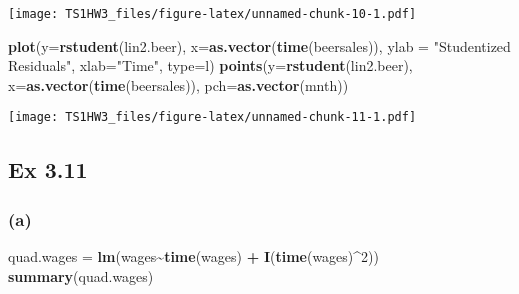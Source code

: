\documentclass[
]{article}
\newenvironment{Shaded}{\begin{snugshade}}{\end{snugshade}}
\newcommand{\AttributeTok}[1]{\textcolor[rgb]{0.13,0.29,0.53}{#1}}
\newcommand{\DecValTok}[1]{\textcolor[rgb]{0.00,0.00,0.81}{#1}}
\newcommand{\FunctionTok}[1]{\textcolor[rgb]{0.13,0.29,0.53}{\textbf{#1}}}
\newcommand{\NormalTok}[1]{#1}
\newcommand{\OtherTok}[1]{\textcolor[rgb]{0.56,0.35,0.01}{#1}}
\newcommand{\SpecialCharTok}[1]{\textcolor[rgb]{0.81,0.36,0.00}{\textbf{#1}}}
\newcommand{\StringTok}[1]{\textcolor[rgb]{0.31,0.60,0.02}{#1}}
\begin{document}
\begin{Shaded}
\end{Shaded}

\texttt{[image: TS1HW3\_files/figure-latex/unnamed-chunk-10-1.pdf]}

\begin{Shaded}
\begin{Highlighting}[]
\FunctionTok{plot}\NormalTok{(}\AttributeTok{y=}\FunctionTok{rstudent}\NormalTok{(lin2.beer), }\AttributeTok{x=}\FunctionTok{as.vector}\NormalTok{(}\FunctionTok{time}\NormalTok{(beersales)), }\AttributeTok{ylab =} \StringTok{"Studentized Residuals"}\NormalTok{, }\AttributeTok{xlab=}\StringTok{"Time"}\NormalTok{, }\AttributeTok{type=}\StringTok{\textquotesingle{}l\textquotesingle{}}\NormalTok{)}
\FunctionTok{points}\NormalTok{(}\AttributeTok{y=}\FunctionTok{rstudent}\NormalTok{(lin2.beer), }\AttributeTok{x=}\FunctionTok{as.vector}\NormalTok{(}\FunctionTok{time}\NormalTok{(beersales)), }\AttributeTok{pch=}\FunctionTok{as.vector}\NormalTok{(mnth))}
\end{Highlighting}
\end{Shaded}

\texttt{[image: TS1HW3\_files/figure-latex/unnamed-chunk-11-1.pdf]}

\hypertarget{ex-3.11}{%
\subsection{Ex 3.11}\label{ex-3.11}}

\hypertarget{a}{%
\subsubsection{(a)}\label{a}}

\begin{Shaded}
\begin{Highlighting}[]
\NormalTok{quad.wages }\OtherTok{=} \FunctionTok{lm}\NormalTok{(wages}\SpecialCharTok{\textasciitilde{}}\FunctionTok{time}\NormalTok{(wages) }\SpecialCharTok{+} \FunctionTok{I}\NormalTok{(}\FunctionTok{time}\NormalTok{(wages)}\SpecialCharTok{\^{}}\DecValTok{2}\NormalTok{))}
\FunctionTok{summary}\NormalTok{(quad.wages)}
\end{Highlighting}
\end{Shaded}
\end{document}
